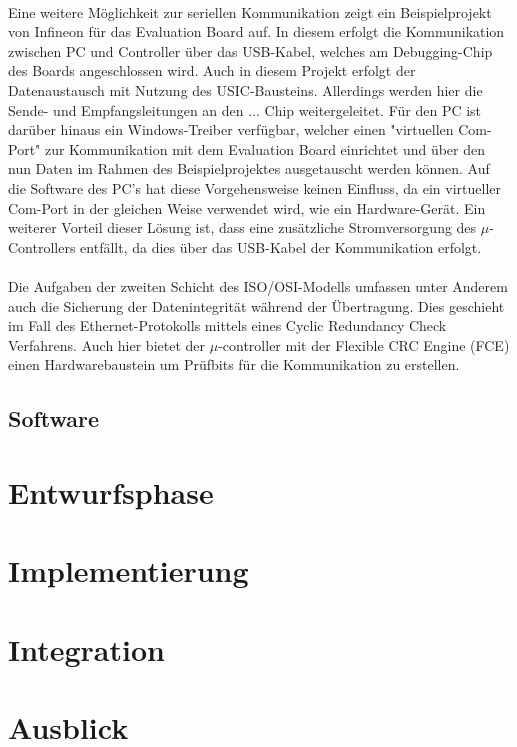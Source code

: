 \paragraph{}
Eine weitere Möglichkeit zur seriellen Kommunikation zeigt ein Beispielprojekt von Infineon für das Evaluation Board auf. In diesem erfolgt die Kommunikation zwischen PC und Controller über das USB-Kabel, welches am Debugging-Chip des Boards angeschlossen wird. Auch in diesem Projekt erfolgt der Datenaustausch mit Nutzung des USIC-Bausteins. Allerdings werden hier die Sende- und Empfangsleitungen an den ... Chip weitergeleitet. Für den PC ist darüber hinaus ein Windows-Treiber verfügbar, welcher einen "virtuellen Com-Port" zur Kommunikation mit dem Evaluation Board einrichtet und über den nun Daten im Rahmen des Beispielprojektes ausgetauscht werden können. Auf die Software des PC's hat diese Vorgehensweise keinen Einfluss, da ein virtueller Com-Port in der gleichen Weise verwendet wird, wie ein Hardware-Gerät. Ein weiterer Vorteil dieser Lösung ist, dass eine zusätzliche Stromversorgung des $\mu$-Controllers entfällt, da dies über das USB-Kabel der Kommunikation erfolgt.
\paragraph{}
Die Aufgaben der zweiten Schicht des ISO/OSI-Modells umfassen unter Anderem auch die Sicherung der Datenintegrität während der Übertragung. Dies geschieht im Fall des Ethernet-Protokolls mittels eines Cyclic Redundancy Check Verfahrens. Auch hier bietet der $\mu$-controller mit der Flexible CRC Engine (FCE) einen Hardwarebaustein um Prüfbits für die Kommunikation zu erstellen.
\subsection{Software}

\section{Entwurfsphase}
\section{Implementierung}
\section{Integration}
\section{Ausblick}
